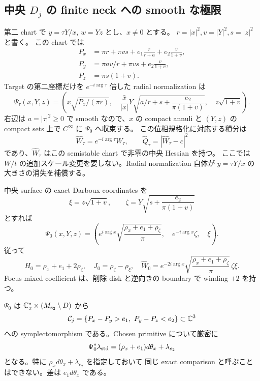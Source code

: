 \subsection{中央 $D_j$ の finite neck への smooth な極限}

第二 chart で $y=\tau Y/x$, $w=Yz$ とし、$x\ne0$ とする。
$r=|x|^2,v=|Y|^2,s=|z|^2$ と書く。
この chart では
\begin{align*}
 P_x&=\pi r+\pi vs+e_1\frac r{r+a}+e_2\frac v{1+v},\\
 P_y&=\pi av/r+\pi vs+e_2\frac v{1+v},\\
 P_z&=\pi s(1+v).
\end{align*}
Target の第二座標だけを $e^{-i\arg\tau}$ 倍した radial normalization は
\begin{equation}\label{tp:Bmap}
 \Psi_\tau(x,Y,z)=\left(
 x\sqrt{P_x/(\pi r)},\quad
 \frac{\bar x}{|x|}Y\sqrt{a/r+s+\frac{e_2}{\pi(1+v)}},\quad
 z\sqrt{1+v}\right).
\end{equation}
右辺は $a=|\tau|^2\ge0$ で smooth なので、$x$ の compact annuli と
$(Y,z)$ の compact sets 上で $C^\infty$ に $\Psi_0$ へ収束する。
この位相規格化に対応する積分は
\[
 \widehat W_\tau=e^{-i\arg\tau} W_\tau,
 \qquad \widehat Q_\tau=|\widehat W_\tau-c|^2
\]
であり、$\widehat W_\tau$ はこの semistable chart で非零の中央 Hessian を持つ。
ここでは $W/t$ の追加スケール変更を要しない。Radial normalization 自体が
$y=\tau Y/x$ の大きさの消失を補償する。

中央 surface の exact Darboux coordinates を
\[
 \xi=z\sqrt{1+v},\qquad
 \zeta=Y\sqrt{s+\frac{e_2}{\pi(1+v)}}
\]
とすれば
\[
 \Psi_0(x,Y,z)=\left(
 e^{i\arg x}\sqrt{\frac{\rho_x+e_1+\rho_\zeta}{\pi}},\quad
 e^{-i\arg x}\zeta,\quad\xi\right).
\]
従って
\begin{equation}\label{tp:central-integrals}
 H_0=\rho_x+e_1+2\rho_\zeta,\quad
 J_0=\rho_\zeta-\rho_\xi,\quad
 \widehat W_0=e^{-2i\arg x}
       \sqrt{\frac{\rho_x+e_1+\rho_\zeta}{\pi}}\,\zeta\xi.
\end{equation}
Focus mixed coefficient は、削除 disk と逆向きの boundary で winding $+2$ を持つ。

\begin{proposition}
$\Psi_0$ は $\mathbb C_x^*\times(M_{e_2}\setminus D)$ から
\[
 \mathcal C_j=\{P_x-P_y>e_1,\ P_y-P_z<e_2\}\subset\CC^3
\]
への symplectomorphism である。Chosen primitive について厳密に
\[
 \Psi_0^*\lambda_{\rm std}
  =(\rho_x+e_1)d\theta_x+\lambda_{e_2}
\]
となる。特に $\rho_xd\theta_x+\lambda_{e_2}$ を指定しておいて
同じ exact comparison と呼ぶことはできない。差は $e_1d\theta_x$ である。
\end{proposition}

